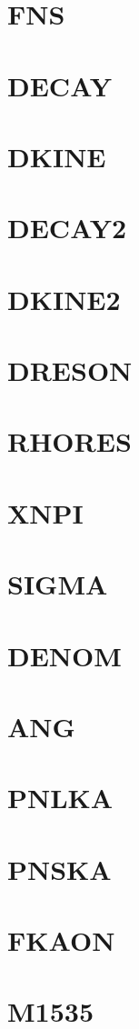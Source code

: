 \documentclass[14pt,UTF8]{ctexbook}
\begin{document}
\section{FNS}
\section{DECAY}
\section{DKINE}
\section{DECAY2}
\section{DKINE2}
\section{DRESON}
\section{RHORES}
\section{XNPI}
\section{SIGMA}
\section{DENOM}
\section{ANG}
\section{PNLKA}
\section{PNSKA}
\section{FKAON}
\section{M1535}
\end{document}
